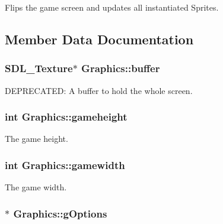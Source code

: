 Flips the game screen and updates all instantiated Sprites. 



\subsection{Member Data Documentation}
\hypertarget{class_graphics_aa3ea5fd0f0a672850bb1352d5ca302f1}{
\subsubsection[{buffer}]{\setlength{\rightskip}{0pt plus 5cm}S\-D\-L\-\_\-\-Texture$\ast$ Graphics\-::buffer\hspace{0.3cm}{\ttfamily [protected]}}}\label{class_graphics_aa3ea5fd0f0a672850bb1352d5ca302f1}


D\-E\-P\-R\-E\-C\-A\-T\-E\-D\-: A buffer to hold the whole screen. 

\hypertarget{class_graphics_ac176bce8a1a8b73f6ed05e68410d9a14}{
\subsubsection[{gameheight}]{\setlength{\rightskip}{0pt plus 5cm}int Graphics\-::gameheight\hspace{0.3cm}{\ttfamily [protected]}}}\label{class_graphics_ac176bce8a1a8b73f6ed05e68410d9a14}


The game height. 

\hypertarget{class_graphics_adf4a36eb3049ba3d07d79af2b4ac6399}{
\subsubsection[{gamewidth}]{\setlength{\rightskip}{0pt plus 5cm}int Graphics\-::gamewidth\hspace{0.3cm}{\ttfamily [protected]}}}\label{class_graphics_adf4a36eb3049ba3d07d79af2b4ac6399}


The game width. 

\hypertarget{class_graphics_aafe6ff08323ccbe6478472e3ec30715c}{
\subsubsection[{g\-Options}]{$\ast$ Graphics\-::g\-Options\hspace{0.3cm}{\ttfamily [protected]}}}\label{class_graphics_aafe6ff08323ccbe6478472e3ec30715c}


